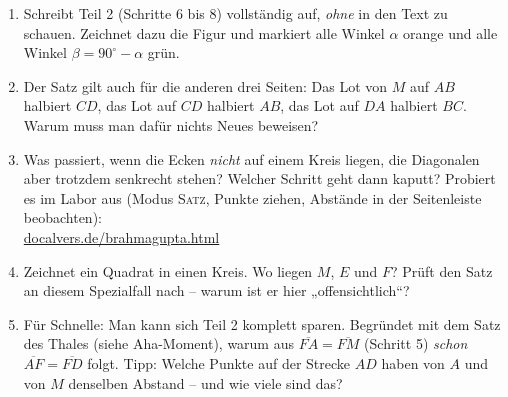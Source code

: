 \documentclass[11pt,a4paper]{article}
\newcommand{\seg}[1]{\overline{#1}}
\begin{document}
\begin{enumerate}[leftmargin=1.8em,itemsep=4pt]
  \item Schreibt Teil 2 (Schritte 6 bis 8) vollst\"andig auf, \emph{ohne} in den Text zu schauen.
        Zeichnet dazu die Figur und markiert alle Winkel $\alpha$ orange und alle Winkel
        $\beta = 90^\circ - \alpha$ gr\"un.
  \item Der Satz gilt auch f\"ur die anderen drei Seiten: Das Lot von $M$ auf $AB$ halbiert $CD$,
        das Lot auf $CD$ halbiert $AB$, das Lot auf $DA$ halbiert $BC$. Warum muss man daf\"ur
        nichts Neues beweisen?
  \item Was passiert, wenn die Ecken \emph{nicht} auf einem Kreis liegen, die Diagonalen aber trotzdem
        senkrecht stehen? Welcher Schritt geht dann kaputt? Probiert es im Labor aus
        (Modus \textsc{Satz}, Punkte ziehen, Abst\"ande in der Seitenleiste beobachten):\\
        \href{https://docalvers.de/brahmagupta.html}{docalvers.de/brahmagupta.html}
  \item Zeichnet ein Quadrat in einen Kreis. Wo liegen $M$, $E$ und $F$? Pr\"uft den Satz an diesem
        Spezialfall nach -- warum ist er hier „offensichtlich“?
  \item F\"ur Schnelle: Man kann sich Teil 2 komplett sparen. Begr\"undet mit dem Satz des Thales
        (siehe Aha-Moment), warum aus $\seg{FA} = \seg{FM}$ (Schritt 5) \emph{schon} $\seg{AF} = \seg{FD}$ folgt.
        Tipp: Welche Punkte auf der Strecke $AD$ haben von $A$ und von $M$ denselben Abstand -- und wie viele sind das?
\end{enumerate}

\vspace{1em}
\end{document}
